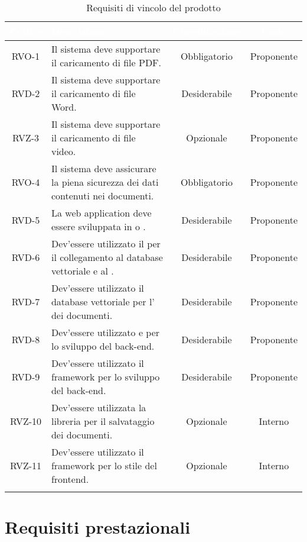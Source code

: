 \begingroup
\setlength{\tabcolsep}{10pt}
\renewcommand{\arraystretch}{1.5}
\begin{xltabular}{\textwidth}{| c | X | c | c |}
    \hline
     \textbf{\textcolor{white}{Codice}} & \textbf{\textcolor{white}{Descrizione}} & \textbf{\textcolor{white}{Classificazione}} & \textbf{\textcolor{white}{Fonte}}\\
    \hline
    \endhead
    RVO-1 & Il sistema deve supportare il caricamento di file PDF. & Obbligatorio & Proponente \\
    \hline
    RVD-2 & Il sistema deve supportare il caricamento di  file Word. & Desiderabile & Proponente \\
    \hline
    RVZ-3 & Il sistema deve supportare il caricamento di  file video. & Opzionale & Proponente \\
    \hline
    RVO-4 & Il sistema deve assicurare la piena sicurezza dei dati contenuti nei documenti. & Obbligatorio & Proponente \\
    \hline
    RVD-5 & La web application deve essere sviluppata in  o . & Desiderabile & Proponente \\
    \hline
    RVD-6 & Dev'essere utilizzato il   per il collegamento al database vettoriale e al . & Desiderabile & Proponente \\
    \hline
    RVD-7 & Dev'essere utilizzato il database vettoriale  per l' dei documenti. & Desiderabile & Proponente \\
    \hline
    RVD-8 & Dev'essere utilizzato  e  per lo sviluppo del back-end. & Desiderabile & Proponente \\
    \hline
    RVD-9 & Dev'essere utilizzato il framework  per lo sviluppo del back-end. & Desiderabile & Proponente \\
    \hline
    RVZ-10 & Dev'essere utilizzata la libreria  per il salvataggio dei documenti. & Opzionale & Interno \\
    \hline
    RVZ-11 & Dev'essere utilizzato il framework  per lo stile del frontend. & Opzionale & Interno \\
    \hline
     \caption{Requisiti di vincolo del prodotto}
    \label{tab:reqvin}
\end{xltabular}
\endgroup

\section{Requisiti prestazionali}

